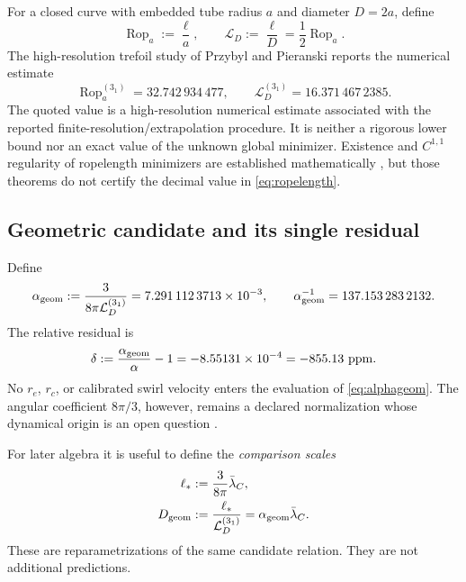 \documentclass[aps,pre,preprint,notitlepage,nofootinbib,superscriptaddress]{revtex4-2}
\newcommand{\lC}{\bar\lambda_C}
\newcommand{\Rop}{\operatorname{Rop}}
\newcommand{\calL}{\mathcal L}
\begin{document}
For a closed curve with embedded tube radius \(a\) and diameter \(D=2a\), define
\begin{equation}
  \Rop_a:=\frac{\ell}{a},
  \qquad
  \calL_D:=\frac{\ell}{D}
  =\frac12\Rop_a.
  \label{eq:rope-conventions}
\end{equation}
The high-resolution trefoil study of Przybyl and Pieranski
\cite{PrzybylPieranski2014} reports the numerical estimate
\begin{equation}
  \Rop_a^{(3_1)}=32.742\,934\,477,
  \qquad
  \calL_D^{(3_1)}=16.371\,467\,2385.
  \label{eq:ropelength}
\end{equation}
The quoted value is a high-resolution numerical estimate associated with the reported finite-resolution/extrapolation procedure.  It is neither a rigorous lower bound nor an exact value of the unknown global minimizer.  Existence and \(C^{1,1}\) regularity of ropelength minimizers are established mathematically \cite{CantarellaKusnerSullivan2002}, but those theorems do not certify the decimal value in \cref{eq:ropelength}.

\subsection{Geometric candidate and its single residual}

Define
\begin{equation}
  \alpha_{\rm geom}
  :=\frac{3}{8\pi\calL_D^{(3_1)}}
  =7.291\,112\,3713\times10^{-3},
  \qquad
  \alpha_{\rm geom}^{-1}
  =137.153\,283\,2132.
  \label{eq:alphageom}
\end{equation}
The relative residual is
\begin{equation}
  \delta
  :=\frac{\alpha_{\rm geom}}{\alpha}-1
  =-8.55131\times10^{-4}
  =-855.13\ \mathrm{ppm}.
  \label{eq:residual}
\end{equation}
No \(r_e\), \(r_c\), or calibrated swirl velocity enters the evaluation of
\cref{eq:alphageom}.  The angular coefficient \(8\pi/3\), however, remains a declared normalization whose dynamical origin is an open question \cite{Iskandarani2026}.

For later algebra it is useful to define the \emph{comparison scales}
\begin{align}
  \ell_* &:=\frac{3}{8\pi}\lC,
  \label{eq:ellstar}\\
  D_{\rm geom}
  &:=\frac{\ell_*}{\calL_D^{(3_1)}}
  =\alpha_{\rm geom}\lC.
  \label{eq:Dgeom}
\end{align}
These are reparametrizations of the same candidate relation.  They are not additional predictions.
\end{document}
